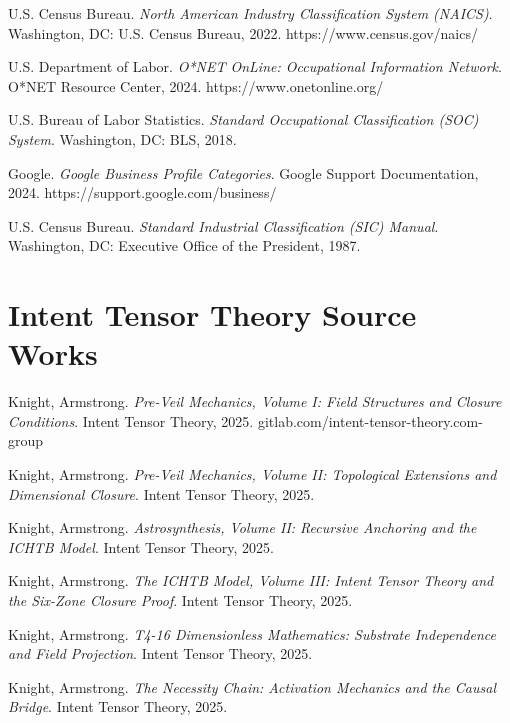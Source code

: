 \documentclass[12pt, openany]{book}
\theoremstyle{thmstyle}
\theoremstyle{defstyle}
\begin{document}
\noindent U.S. Census Bureau. \textit{North American Industry Classification System (NAICS)}. Washington, DC: U.S. Census Bureau, 2022. https://www.census.gov/naics/

\vspace{4pt}
\noindent U.S. Department of Labor. \textit{O*NET OnLine: Occupational Information Network}. O*NET Resource Center, 2024. https://www.onetonline.org/

\vspace{4pt}
\noindent U.S. Bureau of Labor Statistics. \textit{Standard Occupational Classification (SOC) System}. Washington, DC: BLS, 2018.

\vspace{4pt}
\noindent Google. \textit{Google Business Profile Categories}. Google Support Documentation, 2024. https://support.google.com/business/

\vspace{4pt}
\noindent U.S. Census Bureau. \textit{Standard Industrial Classification (SIC) Manual}. Washington, DC: Executive Office of the President, 1987.

\section*{Intent Tensor Theory Source Works}

\noindent Knight, Armstrong. \textit{Pre-Veil Mechanics, Volume I: Field Structures and Closure Conditions}. Intent Tensor Theory, 2025. gitlab.com/intent-tensor-theory.com-group

\vspace{4pt}
\noindent Knight, Armstrong. \textit{Pre-Veil Mechanics, Volume II: Topological Extensions and Dimensional Closure}. Intent Tensor Theory, 2025.

\vspace{4pt}
\noindent Knight, Armstrong. \textit{Astrosynthesis, Volume II: Recursive Anchoring and the ICHTB Model}. Intent Tensor Theory, 2025.

\vspace{4pt}
\noindent Knight, Armstrong. \textit{The ICHTB Model, Volume III: Intent Tensor Theory and the Six-Zone Closure Proof}. Intent Tensor Theory, 2025.

\vspace{4pt}
\noindent Knight, Armstrong. \textit{T4-16 Dimensionless Mathematics: Substrate Independence and Field Projection}. Intent Tensor Theory, 2025.

\vspace{4pt}
\noindent Knight, Armstrong. \textit{The Necessity Chain: Activation Mechanics and the Causal Bridge}. Intent Tensor Theory, 2025.
\end{document}
